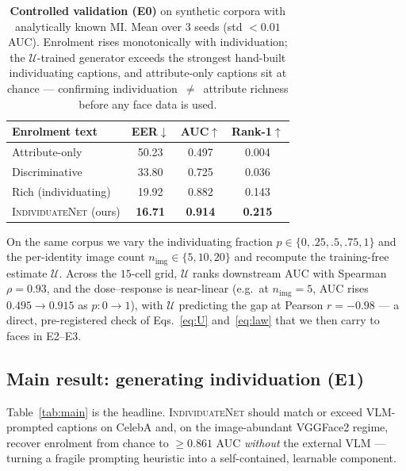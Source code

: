 \documentclass[10pt,twocolumn,letterpaper]{article}
\newcommand{\U}{\mathcal{U}}
\newcommand{\method}{\textsc{IndividuateNet}}
\begin{document}
\begin{table}[t]
  \centering\small
  \setlength{\tabcolsep}{5pt}
  \begin{tabular}{@{}lccc@{}}
    \toprule
    \textbf{Enrolment text} & \textbf{EER}$\downarrow$ & \textbf{AUC}$\uparrow$ & \textbf{Rank-1}$\uparrow$ \\
    \midrule
    Attribute-only          & 50.23 & 0.497 & 0.004 \\
    Discriminative          & 33.80 & 0.725 & 0.036 \\
    Rich (individuating)    & 19.92 & 0.882 & 0.143 \\
    \method{} (ours)        & \textbf{16.71} & \textbf{0.914} & \textbf{0.215} \\
    \bottomrule
  \end{tabular}
  \caption{\textbf{Controlled validation (E0)} on synthetic corpora with analytically known MI.
  Mean over 3 seeds (std $<0.01$ AUC). Enrolment rises monotonically with individuation; the
  $\U$-trained generator exceeds the strongest hand-built individuating captions, and
  attribute-only captions sit at chance --- confirming individuation~$\neq$~attribute richness
  before any face data is used.}
  \label{tab:synth}
\end{table}

On the same corpus we vary the individuating fraction $p\in\{0,.25,.5,.75,1\}$ and the
per-identity image count $n_{\text{img}}\in\{5,10,20\}$ and recompute the training-free estimate
$\U$. Across the $15$-cell grid, $\U$ ranks downstream AUC with Spearman
$\rho=0.93$, and the dose--response is near-linear (e.g.\ at $n_{\text{img}}=5$, AUC rises
$0.495\!\to\!0.915$ as $p:0\!\to\!1$), with $\U$ predicting the gap at Pearson $r=-0.98$ ---
a direct, pre-registered check of Eqs.~\ref{eq:U} and~\ref{eq:law} that we then carry to faces in
E2--E3.

\subsection{Main result: generating individuation (E1)}
\label{sec:e1}
Table~\ref{tab:main} is the headline. \method{} should match or exceed VLM-prompted captions on
CelebA and, on the image-abundant VGGFace2 regime, recover enrolment from chance to
$\ge 0.861$ AUC \emph{without} the external VLM --- turning a fragile prompting heuristic into a
self-contained, learnable component.
\end{document}
